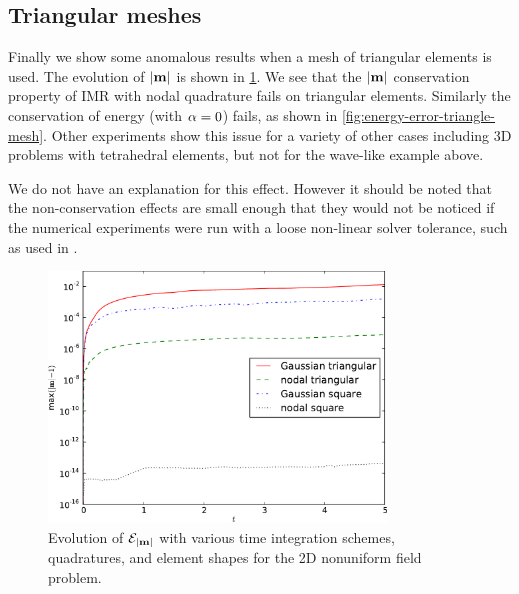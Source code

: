 \subsection{Triangular meshes}
\label{sec:triangular-meshes}

Finally we show some anomalous results when a mesh of triangular elements is used.
The evolution of $\left|{\boldsymbol{\mathrm{m}}} \right|$ is shown in \cref{fig:ml-error-triangle-mesh}.
We see that the $\left|{\boldsymbol{\mathrm{m}}} \right|$ conservation property of IMR with nodal quadrature fails on triangular elements.
Similarly the conservation of energy (with $\alpha = 0$) fails, as shown in \cref{fig:energy-error-triangle-mesh}.
Other experiments show this issue for a variety of other cases including 3D problems with tetrahedral elements, but not for the wave-like example above.

We do not have an explanation for this effect.
However it should be noted that the non-conservation effects are small enough that they would not be noticed if the numerical experiments were run with a loose non-linear solver tolerance, such as used in \eg \cite{Bartels2006}.

\begin{figure}
  \centering
  \includegraphics[width=0.8\textwidth]
  {plots/nonuniform-h-triangles-ml/mlengtherrormaxesvstimes.pdf}
  \caption{
    Evolution of $\mathcal{E}_{\left|{\boldsymbol{\mathrm{m}}} \right|}$
    with various time integration schemes, quadratures, and element shapes
    for the 2D nonuniform field problem.
}
  \label{fig:ml-error-triangle-mesh}
\end{figure}

